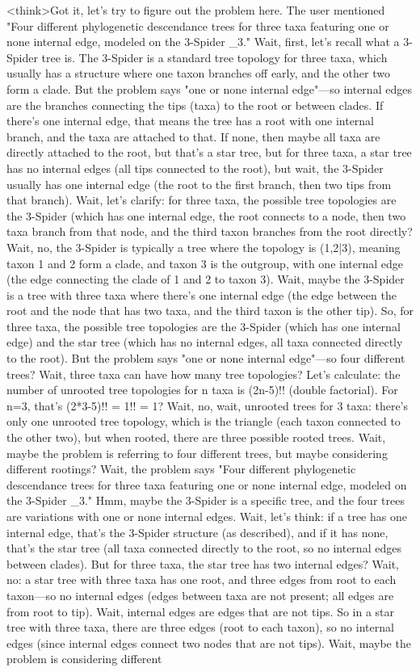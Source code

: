 <think>Got it, let's try to figure out the problem here. The user mentioned "Four different phylogenetic descendance trees for three taxa featuring one or none internal edge, modeled on the 3-Spider _3." Wait, first, let's recall what a 3-Spider tree is. The 3-Spider is a standard tree topology for three taxa, which usually has a structure where one taxon branches off early, and the other two form a clade. But the problem says "one or none internal edge"—so internal edges are the branches connecting the tips (taxa) to the root or between clades. If there's one internal edge, that means the tree has a root with one internal branch, and the taxa are attached to that. If none, then maybe all taxa are directly attached to the root, but that's a star tree, but for three taxa, a star tree has no internal edges (all tips connected to the root), but wait, the 3-Spider usually has one internal edge (the root to the first branch, then two tips from that branch). Wait, let's clarify: for three taxa, the possible tree topologies are the 3-Spider (which has one internal edge, the root connects to a node, then two taxa branch from that node, and the third taxon branches from the root directly? Wait, no, the 3-Spider is typically a tree where the topology is (1,2|3), meaning taxon 1 and 2 form a clade, and taxon 3 is the outgroup, with one internal edge (the edge connecting the clade of 1 and 2 to taxon 3). Wait, maybe the 3-Spider is a tree with three taxa where there's one internal edge (the edge between the root and the node that has two taxa, and the third taxon is the other tip). So, for three taxa, the possible tree topologies are the 3-Spider (which has one internal edge) and the star tree (which has no internal edges, all taxa connected directly to the root). But the problem says "one or none internal edge"—so four different trees? Wait, three taxa can have how many tree topologies? Let's calculate: the number of unrooted tree topologies for n taxa is (2n-5)!! (double factorial). For n=3, that's (2*3-5)!! = 1!! = 1? Wait, no, wait, unrooted trees for 3 taxa: there's only one unrooted tree topology, which is the triangle (each taxon connected to the other two), but when rooted, there are three possible rooted trees. Wait, maybe the problem is referring to four different trees, but maybe considering different rootings? Wait, the problem says "Four different phylogenetic descendance trees for three taxa featuring one or none internal edge, modeled on the 3-Spider _3." Hmm, maybe the 3-Spider is a specific tree, and the four trees are variations with one or none internal edges. Wait, let's think: if a tree has one internal edge, that's the 3-Spider structure (as described), and if it has none, that's the star tree (all taxa connected directly to the root, so no internal edges between clades). But for three taxa, the star tree has two internal edges? Wait, no: a star tree with three taxa has one root, and three edges from root to each taxon—so no internal edges (edges between taxa are not present; all edges are from root to tip). Wait, internal edges are edges that are not tips. So in a star tree with three taxa, there are three edges (root to each taxon), so no internal edges (since internal edges connect two nodes that are not tips). Wait, maybe the problem is considering different 
